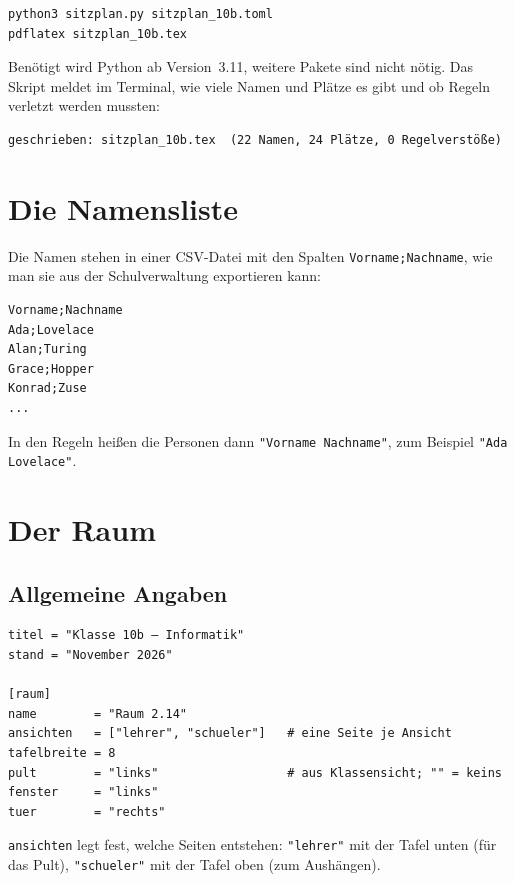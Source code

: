\begin{lstlisting}[style=latex]
python3 sitzplan.py sitzplan_10b.toml
pdflatex sitzplan_10b.tex
\end{lstlisting}

Benötigt wird Python ab Version~3.11, weitere Pakete sind nicht nötig. Das Skript meldet im Terminal, wie viele Namen und Plätze es gibt und ob Regeln verletzt werden mussten:

\begin{lstlisting}[style=latex]
geschrieben: sitzplan_10b.tex  (22 Namen, 24 Plätze, 0 Regelverstöße)
\end{lstlisting}



\section{Die Namensliste}

Die Namen stehen in einer CSV-Datei mit den Spalten \texttt{Vorname;Nachname}, wie man sie aus der Schulverwaltung exportieren kann:

\begin{lstlisting}[style=latex]
Vorname;Nachname
Ada;Lovelace
Alan;Turing
Grace;Hopper
Konrad;Zuse
...
\end{lstlisting}

In den Regeln heißen die Personen dann \texttt{"Vorname Nachname"}, zum Beispiel \texttt{"Ada Lovelace"}.



\section{Der Raum}


\subsection{Allgemeine Angaben}

\begin{lstlisting}[style=latex]
titel = "Klasse 10b – Informatik"
stand = "November 2026"

[raum]
name        = "Raum 2.14"
ansichten   = ["lehrer", "schueler"]   # eine Seite je Ansicht
tafelbreite = 8
pult        = "links"                  # aus Klassensicht; "" = keins
fenster     = "links"
tuer        = "rechts"
\end{lstlisting}

\texttt{ansichten} legt fest, welche Seiten entstehen: \texttt{"lehrer"} mit der Tafel unten (für das Pult), \texttt{"schueler"} mit der Tafel oben (zum Aushängen).



